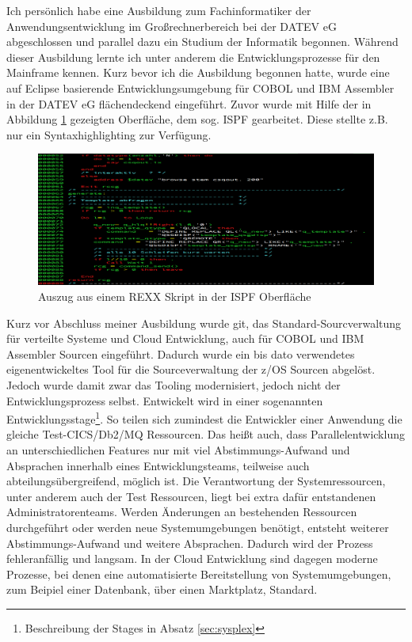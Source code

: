 Ich persönlich habe eine Ausbildung zum Fachinformatiker der Anwendungsentwicklung im Großrechnerbereich bei der DATEV eG abgeschlossen und parallel dazu ein Studium der Informatik begonnen.
Während dieser Ausbildung lernte ich unter anderem die Entwicklungsprozesse für den Mainframe kennen.
Kurz bevor ich die Ausbildung begonnen hatte, wurde eine auf Eclipse basierende Entwicklungsumgebung für COBOL und IBM Assembler in der DATEV eG flächendeckend eingeführt.
Zuvor wurde mit Hilfe der in Abbildung \ref{fig:3270} gezeigten Oberfläche, dem sog. ISPF gearbeitet.
Diese stellte z.B. nur ein Syntaxhighlighting zur Verfügung.

\begin{figure}[h]
\centering
\includegraphics[width=\textwidth]{figures/rexxintso.png}
\caption{Auszug aus einem REXX Skript in der ISPF Oberfläche}
\label{fig:3270}
\end{figure}

Kurz vor Abschluss meiner Ausbildung wurde git, das Standard-Sourcverwaltung für verteilte Systeme und Cloud Entwicklung, auch für COBOL und IBM Assembler Sourcen eingeführt.
Dadurch wurde ein bis dato verwendetes eigenentwickeltes Tool für die Sourceverwaltung der z/OS Sourcen abgelöst.
Jedoch wurde damit zwar das Tooling modernisiert, jedoch nicht der Entwicklungsprozess selbst.
Entwickelt wird in einer sogenannten \glqq Entwicklungsstage\grqq{}\footnote{Beschreibung der Stages in Absatz \ref{sec:sysplex}}. 
So teilen sich zumindest die Entwickler einer Anwendung die gleiche Test-CICS/Db2/MQ Ressourcen.
Das heißt auch, dass Parallelentwicklung an unterschiedlichen Features nur mit viel Abstimmungs-Aufwand und Absprachen innerhalb eines Entwicklungsteams, teilweise auch abteilungsübergreifend, möglich ist.
Die Verantwortung der Systemressourcen, unter anderem auch der Test Ressourcen, liegt bei extra dafür entstandenen Administratorenteams.
Werden Änderungen an bestehenden Ressourcen durchgeführt oder werden neue Systemumgebungen benötigt, entsteht weiterer Abstimmungs-Aufwand und weitere Absprachen.
Dadurch wird der Prozess fehleranfällig und langsam.
In der Cloud Entwicklung sind dagegen moderne Prozesse, bei denen eine automatisierte Bereitstellung von Systemumgebungen, zum Beipiel einer Datenbank, über einen \glqq Marktplatz\grqq, Standard. 

